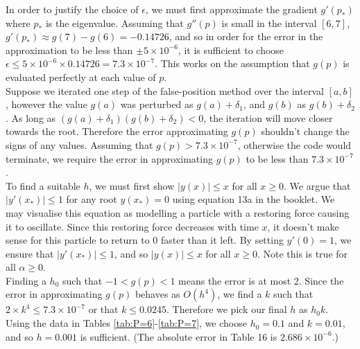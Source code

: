 \documentclass[10pt,a4paper,notitlepage]{article}
\newcommand{\abs}[1]{\lvert#1\rvert}
\begin{document}
In order to justify the choice of $\epsilon$, we must first approximate the gradient $g'(p_{*})$ where $p_{*}$ is the eigenvalue. Assuming that $g''(p)$ is small in the interval $[6,7]$, $g'(p_{*})\approx g(7)-g(6)=-0.14726$, and so in order for the error in the approximation to be less than $\pm 5\times 10^{-6}$, it is sufficient to choose $\epsilon\leq 5\times 10^{-6} \times 0.14726=7.3\times 10^{-7}$. This works on the assumption that $g(p)$ is evaluated perfectly at each value of $p$. \\

Suppose we iterated one step of the false-position method over the interval $[a,b]$, however the value $g(a)$ was perturbed as $g(a)+\delta_{1}$, and $g(b)$ as $g(b)+\delta_{2}$. As long as $\left( g(a)+\delta_{1} \right)\left( g(b)+\delta_{2}\right) < 0$, the iteration will move closer towards the root. Therefore the error approximating $g(p)$ shouldn't change the signs of any values. Assuming that $g(p)>7.3\times 10^{-7}$, otherwise the code would terminate, we require the error in approximating $g(p)$ to be less than $7.3\times 10^{-7}$.  \\

To find a suitable $h$, we must first show $\abs{y(x)}\leq x$ for all $x\geq 0$. We argue that $\abs{y'(x_{*})}\leq 1$ for any root $y(x_{*})=0$ using equation 13a in the booklet. We may visualise this equation as modelling a particle with a restoring force causing it to oscillate. Since this restoring force decreases with time $x$, it doesn't make sense for this particle to return to 0 faster than it left. By setting $y'(0)=1$, we ensure that $\abs{y'(x_{*})}\leq 1$, and so $\abs{y(x)}\leq x$ for all $x\geq 0$. Note this is true for all $\alpha\geq 0$.\\

Finding a $h_{0}$ such that $-1<g(p)<1$ means the error  is at most 2. Since the error in approximating $g(p)$ behaves as $O\left(h^{4}\right)$, we find a $k$ such that $2\times k^{4}\leq 7.3\times 10^{-7}$ or that $k\leq 0.0245$.  Therefore we pick our final $h$ as $h_{0}k$. Using the data in Tables \ref{tab:P=6}-\ref{tab:P=7}, we choose $h_{0}=0.1$ and $k= 0.01$, and so $h=0.001$ is sufficient. (The absolute error in Table 16 is $2.686\times 10^{-6}$.)\\ 
\end{document}
